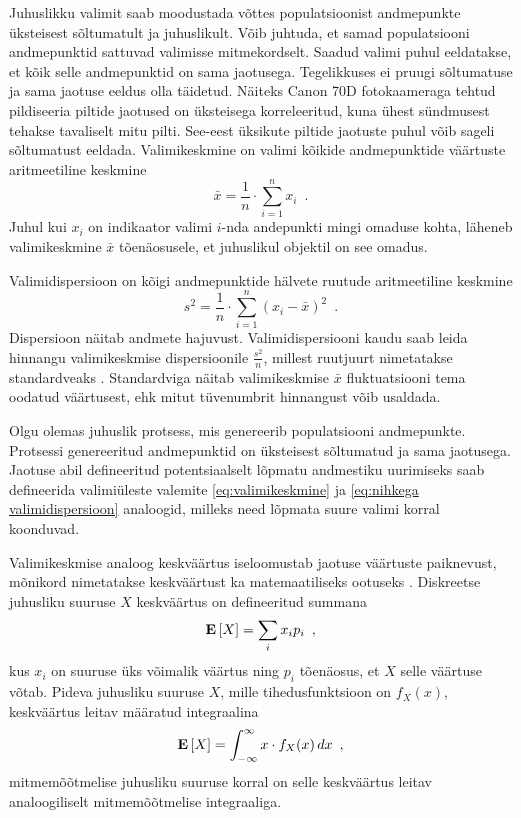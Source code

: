 Juhuslikku valimit saab moodustada võttes populatsioonist andmepunkte üksteisest sõltumatult ja juhuslikult. Võib juhtuda, et samad populatsiooni andmepunktid sattuvad valimisse mitmekordselt. Saadud valimi puhul eeldatakse, et kõik selle andmepunktid on sama jaotusega. Tegelikkuses ei pruugi sõltumatuse ja sama jaotuse eeldus olla täidetud. Näiteks Canon 70D fotokaameraga tehtud pildiseeria piltide jaotused on üksteisega korreleeritud, kuna  ühest sündmusest tehakse tavaliselt mitu pilti. See-eest üksikute piltide jaotuste puhul võib sageli sõltumatust eeldada. Valimikeskmine on valimi kõikide andmepunktide väärtuste aritmeetiline keskmine
\begin{equation}
    \label{eq:valimikeskmine}
    \bar{x}=\frac{1}{n}\cdot\sum_{i = 1}^{n}x_i \enspace.
\end{equation}
Juhul kui $x_i$ on indikaator valimi $i$-nda andepunkti mingi omaduse kohta, läheneb valimikeskmine $\bar{x}$ tõenäosusele, et juhuslikul objektil on see omadus.

Valimidispersioon on kõigi andmepunktide hälvete ruutude aritmeetiline keskmine
\begin{equation}
    \label{eq:nihkega valimidispersioon}
    s^2=\frac{1}{n}\cdot\sum_{i=1}^{n}(x_i-\bar{x})^2 \enspace.
\end{equation}
Dispersioon näitab andmete hajuvust. Valimidispersiooni kaudu saab leida hinnangu valimikeskmise dispersioonile $\frac{s^2}{n}$, millest ruutjuurt nimetatakse standardveaks \cite{rakendusstatisika-algkursus}. Standardviga näitab valimikeskmise $\bar{x}$ fluktuatsiooni tema oodatud väärtusest, ehk mitut tüvenumbrit hinnangust võib usaldada.

Olgu olemas juhuslik protsess, mis genereerib populatsiooni andmepunkte. Protsessi genereeritud andmepunktid on üksteisest sõltumatud ja sama jaotusega. Jaotuse abil defineeritud potentsiaalselt lõpmatu andmestiku uurimiseks saab defineerida valimiüleste valemite \eqref{eq:valimikeskmine} ja \eqref{eq:nihkega valimidispersioon} analoogid, milleks need lõpmata suure valimi korral koonduvad.

Valimikeskmise analoog keskväärtus iseloomustab jaotuse väärtuste paiknevust, mõnikord nimetatakse keskväärtust ka matemaatiliseks ootuseks \cite{tõenäosusteooria-algkursus}. Diskreetse juhusliku suuruse $X$ keskväärtus on defineeritud summana
\begin{equation}
    \label{eq:keskväärtus}
    \operatorname*{\mathbf{E}}\left[X\right]=\sum_{i}x_i p_i \enspace,
\end{equation}
kus $x_i$ on suuruse üks võimalik väärtus ning $p_i$ tõenäosus, et $X$ selle väärtuse võtab. Pideva juhusliku suuruse $X$, mille tihedusfunktsioon on $f_X(x)$, keskväärtus leitav määratud integraalina
\begin{equation*}
    \operatorname*{\mathbf{E}}\left[X\right]=\int_{-\infty}^{\infty}x\cdot f_X(x)\,dx \enspace,
\end{equation*}
mitmemõõtmelise juhusliku suuruse korral on selle keskväärtus leitav analoogiliselt mitmemõõtmelise integraaliga.

